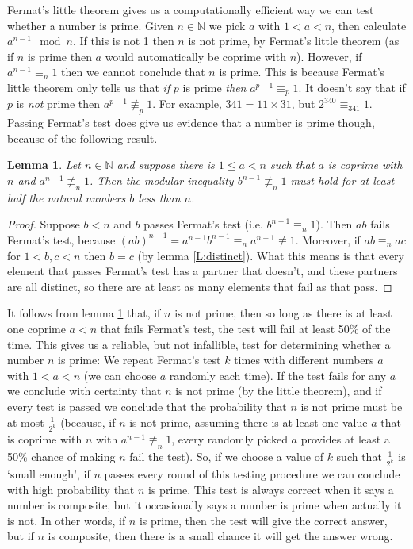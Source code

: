 \documentclass{article}
\theoremstyle{plain}
\newtheorem{lemma}[theorem]{Lemma}{\bfseries}{\upshape}
\newcommand{\bN}{\mathbb{N}}
\begin{document}
Fermat's little theorem gives us a computationally efficient way we can test whether a number is prime. Given $n\in \bN$ we pick $a$ with $1<a<n$, then calculate $a^{n-1} \mod n$. If this is not 1 then $n$ is not prime, by Fermat's little theorem (as if $n$ is prime then $a$ would automatically be coprime with $n$). However, if $a^{n-1} \equiv_n 1$ then we cannot conclude that $n$ is prime. This is because Fermat's little theorem only tells us that \emph{if} $p$ is prime \emph{then} $a^{p-1}\equiv_p 1$. It doesn't say that if $p$ is \emph{not} prime then $a^{p-1}\not\equiv_p 1$. For example, $341 = 11\times31$, but $2^{340} \equiv_{341} 1$. Passing Fermat's test does give us evidence that a number is prime though, because of the following result.

\begin{lemma}\label{L:half}
Let $n\in \bN$ and suppose there is $1\leq a<n$ such that $a$ is coprime with $n$ and $a^{n-1}\not\equiv_n 1$. Then the modular inequality $b^{n-1}\not\equiv_n 1$ must hold for at least half the natural numbers $b$ less than $n$. 
\end{lemma} 
\begin{proof}
Suppose $b<n$ and $b$ passes Fermat's test (i.e. $b^{n-1}\equiv_n 1$). Then $ab$ fails Fermat's test, because $(ab)^{n-1} = a^{n-1}b^{n-1}\equiv_n a^{n-1}\not\equiv 1$. Moreover, if $ab\equiv_n ac$ for $1<b,c< n$ then $b=c$ (by lemma \ref{L:distinct}). What this means is that every element that passes Fermat's test has a partner that doesn't, and these partners are all distinct, so there are at least as many elements that fail as that pass. 
\end{proof}

It follows from lemma \ref{L:half} that, if $n$ is not prime, then so long as there is at least one coprime $a< n$ that fails Fermat's test, the test will fail at least 50\% of the time. This gives us a reliable, but not infallible, test for determining whether a number $n$ is prime: We repeat Fermat's test $k$ times with different numbers $a$ with $1<a<n$ (we can choose $a$ randomly each time). If the test fails for any $a$ we conclude with certainty that $n$ is not prime (by the little theorem), and if every test is passed we conclude that the probability that $n$ is not prime must be at most $\frac{1}{2^k}$ (because, if $n$ is not prime, assuming there is at least one value $a$ that is coprime with $n$ with $a^{n-1}\not\equiv_n 1$, every randomly picked $a$ provides at least a 50\% chance of making $n$ fail the test). So, if we choose a value of $k$ such that $\frac{1}{2^k}$ is `small enough', if $n$ passes every round of this testing procedure we can conclude with high probability that $n$ is prime. This test is always correct when it says a number is composite, but it occasionally says a number is prime when actually it is not. In other words, if $n$ is prime, then the test will give the correct answer, but if $n$ is composite, then there is a small chance it will get the answer wrong. 
\end{document}
